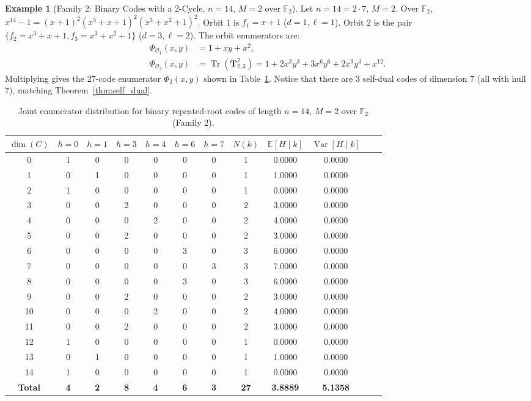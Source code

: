 \documentclass[preprint,12pt]{elsarticle}
\newcommand{\Tr}{\operatorname{Tr}}
\newcommand{\Var}{\operatorname{Var}}
\numberwithin{equation}{section}
\theoremstyle{plain}
\theoremstyle{definition}
\newtheorem{example}[theorem]{Example}
\theoremstyle{remark}
\begin{document}
\begin{example}[Family 2: Binary Codes with a 2-Cycle, $n=14$, $M=2$ over $\mathbb{F}_2$]
Let $n = 14 = 2 \cdot 7$, $M = 2$. Over $\mathbb{F}_2$, $x^{14} - 1 = (x+1)^2 (x^3+x+1)^2 (x^3+x^2+1)^2$.
Orbit 1 is $f_1 = x+1$ ($d=1, \ell=1$). Orbit 2 is the pair $\{f_2 = x^3+x+1, f_3 = x^3+x^2+1\}$ ($d=3, \ell=2$).
The orbit enumerators are:
\begin{align*}
    \Phi_{\mathcal{O}_1}(x, y) &= 1 + x y + x^2, \\
    \Phi_{\mathcal{O}_2}(x, y) &= \Tr(\mathbf{T}_{2, 3}^2) = 1 + 2 x^3 y^3 + 3 x^6 y^6 + 2 x^9 y^3 + x^{12}.
\end{align*}
Multiplying gives the 27-code enumerator $\Phi_2(x, y)$ shown in Table~\ref{tab:family2}. Notice that there are $3$ self-dual codes of dimension $7$ (all with hull $7$), matching Theorem~\ref{thm:self_dual}.
\end{example}

\begin{table}[htbp]
\centering
\small
\caption{Joint enumerator distribution for binary repeated-root codes of length $n=14$, $M=2$ over $\mathbb{F}_2$ (Family 2).}
\label{tab:family2}
\begin{tabular}{cccccccccccc}
\toprule
$\dim(C)$ & $h=0$ & $h=1$ & $h=3$ & $h=4$ & $h=6$ & $h=7$ & $N(k)$ & $\mathbb{E}[H \mid k]$ & $\Var[H \mid k]$ \\
\midrule
0 & 1 & 0 & 0 & 0 & 0 & 0 & 1 & 0.0000 & 0.0000 \\
1 & 0 & 1 & 0 & 0 & 0 & 0 & 1 & 1.0000 & 0.0000 \\
2 & 1 & 0 & 0 & 0 & 0 & 0 & 1 & 0.0000 & 0.0000 \\
3 & 0 & 0 & 2 & 0 & 0 & 0 & 2 & 3.0000 & 0.0000 \\
4 & 0 & 0 & 0 & 2 & 0 & 0 & 2 & 4.0000 & 0.0000 \\
5 & 0 & 0 & 2 & 0 & 0 & 0 & 2 & 3.0000 & 0.0000 \\
6 & 0 & 0 & 0 & 0 & 3 & 0 & 3 & 6.0000 & 0.0000 \\
7 & 0 & 0 & 0 & 0 & 0 & 3 & 3 & 7.0000 & 0.0000 \\
8 & 0 & 0 & 0 & 0 & 3 & 0 & 3 & 6.0000 & 0.0000 \\
9 & 0 & 0 & 2 & 0 & 0 & 0 & 2 & 3.0000 & 0.0000 \\
10 & 0 & 0 & 0 & 2 & 0 & 0 & 2 & 4.0000 & 0.0000 \\
11 & 0 & 0 & 2 & 0 & 0 & 0 & 2 & 3.0000 & 0.0000 \\
12 & 1 & 0 & 0 & 0 & 0 & 0 & 1 & 0.0000 & 0.0000 \\
13 & 0 & 1 & 0 & 0 & 0 & 0 & 1 & 1.0000 & 0.0000 \\
14 & 1 & 0 & 0 & 0 & 0 & 0 & 1 & 0.0000 & 0.0000 \\
\midrule
\textbf{Total} & \textbf{4} & \textbf{2} & \textbf{8} & \textbf{4} & \textbf{6} & \textbf{3} & \textbf{27} & \textbf{3.8889} & \textbf{5.1358} \\
\bottomrule
\end{tabular}
\end{table}
\end{document}
